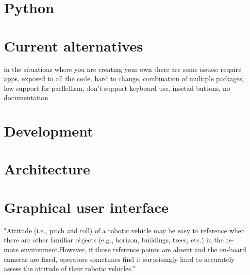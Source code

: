 \section{Python}


\section{Current alternatives}


in the situations where you are creating your own there are some issues: require apps, exposed to all the code, hard to change, combination of multiple packages, low support for parllellism, don't support keyboard use, insetad buttons, no documentation

\section{Development}


\section{Architecture}


\section{Graphical user interface}

\citep{Chen2007} "Attitude (i.e., pitch and roll) of a robotic vehicle may be easy to reference when there are other familiar objects (e.g., horizon, buildings, trees, etc.) in the re- mote environment.However, if those reference points are absent and the on-board cameras are fixed, operators sometimes find it surprisingly hard to accurately assess the attitude of their robotic vehicles."

